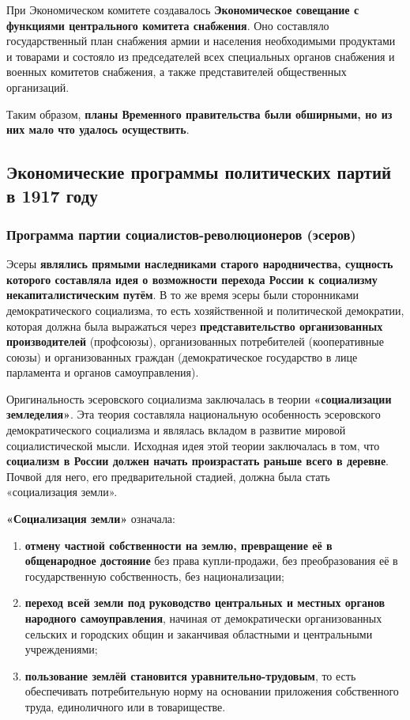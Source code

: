\documentclass{article}
\begin{document}
\hfill

При Экономическом комитете создавалось \textbf{Экономическое совещание с функциями центрального комитета снабжения}. Оно составляло государственный план снабжения армии и населения необходимыми продуктами и товарами и состояло из председателей всех специальных органов снабжения и военных комитетов снабжения, а также представителей общественных организаций.

\hfill

Таким образом, \textbf{планы Временного правительства были обширными, но из них мало что удалось осуществить}.

\pagebreak
\subsection{Экономические программы политических партий в 1917 году}

\subsubsection{Программа партии социалистов-революционеров (эсеров)}

Эсеры \textbf{являлись прямыми наследниками старого народничества, сущность которого составляла идея о возможности перехода России к социализму некапиталистическим путём}. В то же время эсеры были сторонниками демократического социализма, то есть хозяйственной и политической демократии, которая должна была выражаться через \textbf{представительство организованных производителей} (профсоюзы), организованных потребителей (кооперативные союзы) и организованных граждан (демократическое государство в лице парламента и органов самоуправления).

\hfill

Оригинальность эсеровского социализма заключалась в теории \textbf{«социализации земледелия»}. Эта теория составляла национальную особенность эсеровского демократического социализма и являлась вкладом в развитие мировой социалистической мысли. Исходная идея этой теории заключалась в том, что \textbf{социализм в России должен начать произрастать раньше всего в деревне}. Почвой для него, его предварительной стадией, должна была стать «социализация земли». 

\hfill

\textbf{«Социализация земли»} означала:

\begin{enumerate}
    \item \textbf{отмену частной собственности на землю, превращение её в общенародное достояние} без права купли-продажи, без преобразования её в государственную собственность, без национализации;
    \item \textbf{переход всей земли под руководство центральных и местных органов народного самоуправления}, начиная от демократически организованных сельских и городских общин и заканчивая областными и центральными учреждениями;
    \item \textbf{пользование землёй становится уравнительно-трудовым}, то есть обеспечивать потребительную норму на основании приложения собственного труда, единоличного или в товариществе.
\end{enumerate}
\end{document}
